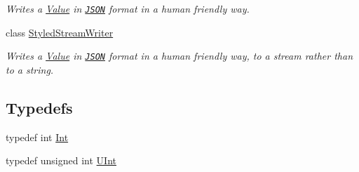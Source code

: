 \begin{DoxyCompactItemize}
\begin{DoxyCompactList}\small\item\em Writes a \hyperlink{classJson_1_1Value}{Value} in \href{http://www.json.org}{\tt J\-S\-O\-N} format in a human friendly way. \end{DoxyCompactList}\item 
class \hyperlink{classJson_1_1StyledStreamWriter}{Styled\-Stream\-Writer}
\begin{DoxyCompactList}\small\item\em Writes a \hyperlink{classJson_1_1Value}{Value} in \href{http://www.json.org}{\tt J\-S\-O\-N} format in a human friendly way, to a stream rather than to a string. \end{DoxyCompactList}\end{DoxyCompactItemize}
\subsection*{Typedefs}
\begin{DoxyCompactItemize}
\item 
typedef int \hyperlink{namespaceJson_a08122e8005b706d982e48cca1e2119c7}{Int}
\item 
typedef unsigned int \hyperlink{namespaceJson_a800fb90eb6ee8d5d62b600c06f87f7d4}{U\-Int}
\end{DoxyCompactItemize}
